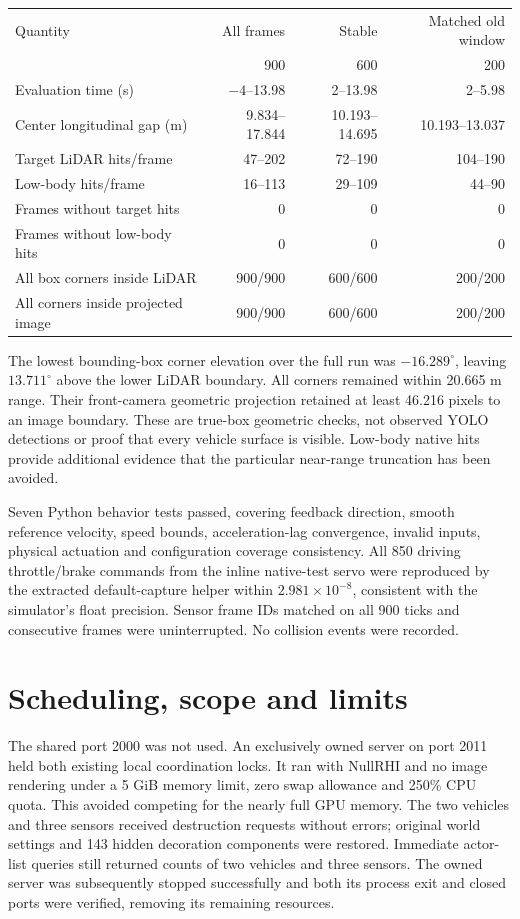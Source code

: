 \documentclass[11pt]{article}
\begin{document}
\begin{center}\small
\begin{tabular}{@{}lrrr@{}}\toprule
Quantity & All frames & Stable & Matched old window \\
 & 900 & 600 & 200 \\\midrule
Evaluation time (s) & $-4$--13.98 & 2--13.98 & 2--5.98 \\
Center longitudinal gap (m) & 9.834--17.844 & 10.193--14.695 & 10.193--13.037 \\
Target LiDAR hits/frame & 47--202 & 72--190 & 104--190 \\
Low-body hits/frame & 16--113 & 29--109 & 44--90 \\
Frames without target hits & 0 & 0 & 0 \\
Frames without low-body hits & 0 & 0 & 0 \\
All box corners inside LiDAR & 900/900 & 600/600 & 200/200 \\
All corners inside projected image & 900/900 & 600/600 & 200/200 \\
\bottomrule\end{tabular}
\end{center}
The lowest bounding-box corner elevation over the full run was
$-16.289^\circ$, leaving $13.711^\circ$ above the lower LiDAR boundary.
All corners remained within 20.665 m range. Their front-camera geometric
projection retained at least 46.216 pixels to an image boundary. These are
true-box geometric checks, not observed YOLO detections or proof that every
vehicle surface is visible. Low-body native hits provide additional evidence
that the particular near-range truncation has been avoided.

Seven Python behavior tests passed, covering feedback direction, smooth
reference velocity, speed bounds, acceleration-lag convergence, invalid
inputs, physical actuation and configuration coverage consistency. All
850 driving throttle/brake commands from the inline native-test servo were
reproduced by the extracted default-capture helper within $2.981\times10^{-8}$,
consistent with the simulator's float precision. Sensor frame IDs matched on
all 900 ticks and consecutive frames were uninterrupted. No collision events
were recorded.

\section{Scheduling, scope and limits}
The shared port 2000 was not used. An exclusively owned server on port 2011
held both existing local coordination locks. It ran with NullRHI and no image
rendering under a 5 GiB memory limit, zero swap allowance and 250\% CPU quota.
This avoided competing for the nearly full GPU memory. The two vehicles and
three sensors received destruction requests without errors; original world
settings and 143 hidden decoration components were restored. Immediate
actor-list queries still returned counts of two vehicles and three
sensors. The owned server was subsequently stopped successfully and both its
process exit and closed ports were verified, removing its remaining resources.
\end{document}

